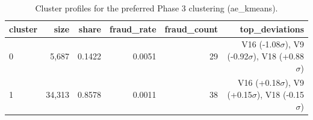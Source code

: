 \begin{table}[htbp]
\centering
\begin{tabular}{lrrrrr}
\toprule
cluster & size & share & fraud\_rate & fraud\_count & top\_deviations \\
\midrule
0 & 5{,}687 & 0.1422 & 0.0051 & 29 & V16 (-1.08$\sigma$), V9 (-0.92$\sigma$), V18 (+0.88$\sigma$) \\
1 & 34{,}313 & 0.8578 & 0.0011 & 38 & V16 (+0.18$\sigma$), V9 (+0.15$\sigma$), V18 (-0.15$\sigma$) \\
\bottomrule
\end{tabular}
\caption{Cluster profiles for the preferred Phase 3 clustering (ae\_kmeans).}
\label{tab:profiles}
\end{table}
